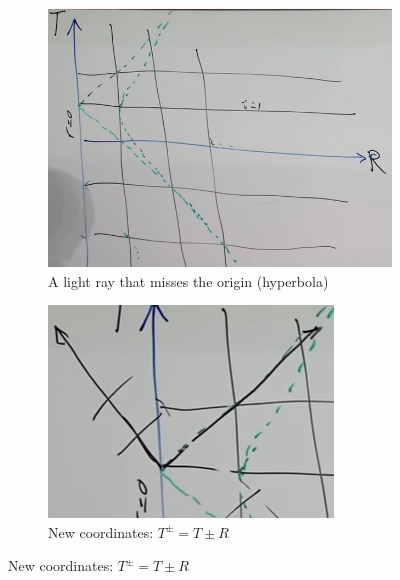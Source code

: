 \documentclass[]{article}
\begin{document}
{\begin{figure}[H]
\begin{center}
\begin{subfigure}[t]{0.3\textwidth}
		\end{subfigure}
		\begin{subfigure}[t]{0.3\textwidth}
			\caption{A light ray that misses the origin (hyperbola)}\label{fig:gr-8-light-ray-missing-origin-tr}
			\includegraphics[width=\textwidth]{gr-8-light-ray-missing-origin-tr}
		\end{subfigure}
		\begin{subfigure}[t]{0.3\textwidth}
			\caption{New coordinates: $T^\pm=T\pm R$}\label{fig:gr-8-TpmR}
			\includegraphics[width=\textwidth]{gr-8-TpmR}
		\end{subfigure}
	\end{center}
\end{figure}

}
\end{document}
